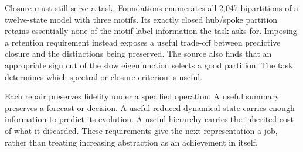 Closure must still serve a task. Foundations enumerates all 2,047 bipartitions of a twelve-state model with three motifs. Its exactly closed hub/spoke partition retains essentially none of the motif-label information the task asks for. Imposing a retention requirement instead exposes a useful trade-off between predictive closure and the distinctions being preserved. The source also finds that an appropriate sign cut of the slow eigenfunction selects a good partition. The task determines which spectral or closure criterion is useful.

Each repair preserves fidelity under a specified operation. A useful summary preserves a forecast or decision. A useful reduced dynamical state carries enough information to predict its evolution. A useful hierarchy carries the inherited cost of what it discarded. These requirements give the next representation a job, rather than treating increasing abstraction as an achievement in itself.

